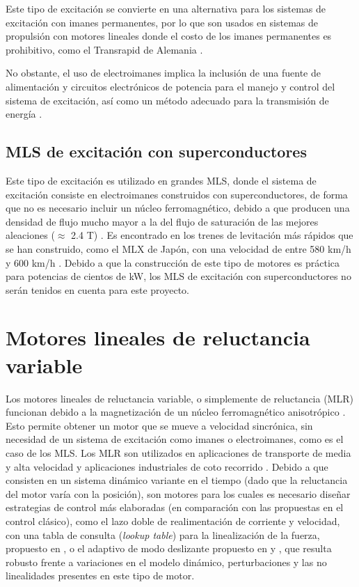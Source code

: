 Este tipo de excitación se convierte en una alternativa para los sistemas de excitación con imanes permanentes, por lo que son usados en sistemas de propulsión con motores lineales donde el costo de los imanes permanentes es prohibitivo, como el  Transrapid de Alemania \cite{leekimlee2006}.

No obstante, el uso de electroimanes implica la inclusión de una fuente de alimentación y circuitos electrónicos de potencia para el manejo y control del sistema de excitación, así como un método adecuado para la transmisión de energía \cite{shibata1992,andriollo1997,minchen2004}.

\subsection{MLS de excitación con superconductores}
Este tipo de excitación es utilizado en grandes MLS, donde el sistema de excitación consiste en electroimanes construidos con superconductores, de forma que no es necesario incluir un núcleo ferromagnético, debido a que producen una densidad de flujo mucho mayor a la del flujo de saturación de las mejores aleaciones ($\approx$ 2.4 T) \cite{gieras2000}. Es encontrado en los trenes de levitación más rápidos que se han construido, como el MLX de Japón, con una velocidad de entre 580 km/h y 600 km/h \cite{leekimlee2006}. Debido a que la construcción de este tipo de motores es práctica para potencias de cientos de kW, los MLS de excitación con superconductores no serán tenidos en cuenta para este proyecto.

\section{Motores lineales de reluctancia variable}
Los motores lineales de reluctancia variable, o simplemente de reluctancia (MLR) funcionan debido a la magnetización de un núcleo ferromagnético anisotrópico \cite{chapman2003}. Esto permite obtener un motor que se mueve a velocidad sincrónica, sin necesidad de un sistema de excitación como imanes o electroimanes, como es el caso de los MLS. Los MLR son utilizados en aplicaciones de transporte de media y alta velocidad  y aplicaciones industriales de coto recorrido \cite{boldea2013}. Debido a que consisten en un sistema dinámico variante en el tiempo (dado que la reluctancia del motor varía con la posición), son motores para los cuales es necesario diseñar estrategias de control más elaboradas (en comparación con las propuestas en el control clásico), como el lazo doble de realimentación de corriente y velocidad, con una tabla de consulta (\textit{lookup table}) para la linealización de la fuerza, propuesto en \cite{waichuen2003}, o el adaptivo de modo deslizante propuesto en \cite{pupadubsin2012} y \cite{habeeb2014}, que resulta robusto frente a variaciones en el modelo dinámico, perturbaciones y las no linealidades presentes en este tipo de motor. 

